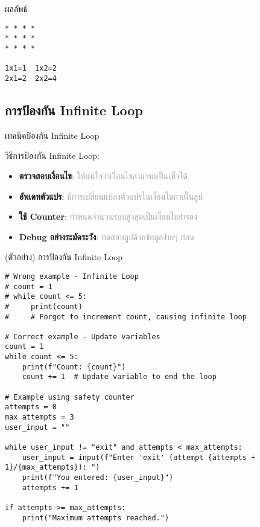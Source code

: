 \documentclass[12pt,a4paper]{article}
\newcommand{\textlight}[1]{{\thailightfont #1}}
\begin{document}
\begin{resultbox}{ผลลัพธ์}
\begin{verbatim}
* * * * 
* * * * 
* * * * 

1x1=1  1x2=2  
2x1=2  2x2=4  
\end{verbatim}
\end{resultbox}

\vspace{2.5cm}

\subsection{การป้องกัน Infinite Loop}

\hspace{1cm}\textlight{Infinite Loop หรือการวนซ้ำแบบไม่สิ้นสุดเป็นปัญหาที่พบบ่อยและสำคัญในการเขียนโปรแกรม เกิดจากเงื่อนไขที่ไม่เปลี่ยนแปลงหรือไม่มีทางเป็นเท็จได้ การเข้าใจและป้องกันปัญหานี้เป็นทักษะพื้นฐานที่นักศึกษาต้องเรียนรู้ เพื่อให้สามารถเขียนโปรแกรมที่ทำงานได้อย่างมั่นคงและปลอดภัย}

\begin{noticebox}{เทคนิคป้องกัน Infinite Loop}

\textlight{วิธีการป้องกัน Infinite Loop:}

\begin{itemize}
    \item \textbf{ตรวจสอบเงื่อนไข}: \textcolor{darkgray}{ให้แน่ใจว่าเงื่อนไขสามารถเป็นเท็จได้}
    \item \textbf{อัพเดทตัวแปร}: \textcolor{darkgray}{มีการเปลี่ยนแปลงตัวแปรในเงื่อนไขภายในลูป}
    \item \textbf{ใช้ Counter}: \textcolor{darkgray}{กำหนดจำนวนรอบสูงสุดเป็นเงื่อนไขสำรอง}
    \item \textbf{Debug อย่างระมัดระวัง}: \textcolor{darkgray}{ทดสอบลูปด้วยข้อมูลง่ายๆ ก่อน}
\end{itemize}

\end{noticebox}

\begin{codebox}{(ตัวอย่าง) การป้องกัน Infinite Loop}
\begin{lstlisting}[style=python]
# Wrong example - Infinite Loop
# count = 1
# while count <= 5:
#     print(count)
#     # Forgot to increment count, causing infinite loop

# Correct example - Update variables
count = 1
while count <= 5:
    print(f"Count: {count}")
    count += 1  # Update variable to end the loop

# Example using safety counter
attempts = 0
max_attempts = 3
user_input = ""

while user_input != "exit" and attempts < max_attempts:
    user_input = input(f"Enter 'exit' (attempt {attempts + 1}/{max_attempts}): ")
    print(f"You entered: {user_input}")
    attempts += 1

if attempts >= max_attempts:
    print("Maximum attempts reached.")
\end{lstlisting}
\end{codebox}
\end{document}
